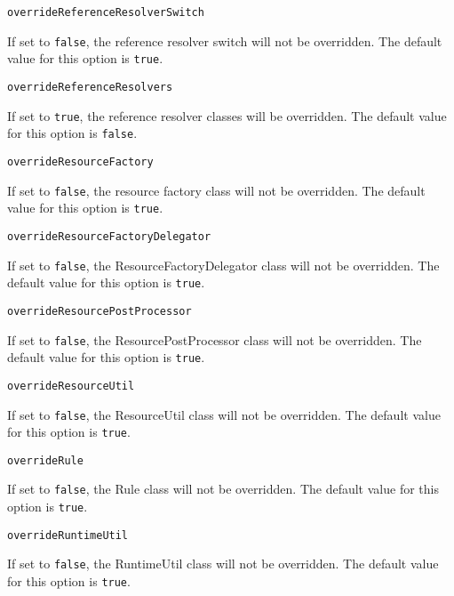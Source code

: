 \noindent\texttt{overrideReferenceResolverSwitch}
\begin{myindentpar}{1cm}
If set to \texttt{false}, the reference resolver switch will not be overridden. The default value for this option is \texttt{true}.
\end{myindentpar}

\noindent\texttt{overrideReferenceResolvers}
\begin{myindentpar}{1cm}
If set to \texttt{true}, the reference resolver classes will be overridden. The default value for this option is \texttt{false}.
\end{myindentpar}

\noindent\texttt{overrideResourceFactory}
\begin{myindentpar}{1cm}
If set to \texttt{false}, the resource factory class will not be overridden. The default value for this option is \texttt{true}.
\end{myindentpar}

\noindent\texttt{overrideResourceFactoryDelegator}
\begin{myindentpar}{1cm}
If set to \texttt{false}, the ResourceFactoryDelegator class will not be overridden. The default value for this option is \texttt{true}.
\end{myindentpar}

\noindent\texttt{overrideResourcePostProcessor}
\begin{myindentpar}{1cm}
If set to \texttt{false}, the ResourcePostProcessor class will not be overridden. The default value for this option is \texttt{true}.
\end{myindentpar}

\noindent\texttt{overrideResourceUtil}
\begin{myindentpar}{1cm}
If set to \texttt{false}, the ResourceUtil class will not be overridden. The default value for this option is \texttt{true}.
\end{myindentpar}

\noindent\texttt{overrideRule}
\begin{myindentpar}{1cm}
If set to \texttt{false}, the Rule class will not be overridden. The default value for this option is \texttt{true}.
\end{myindentpar}

\noindent\texttt{overrideRuntimeUtil}
\begin{myindentpar}{1cm}
If set to \texttt{false}, the RuntimeUtil class will not be overridden. The default value for this option is \texttt{true}.
\end{myindentpar}


